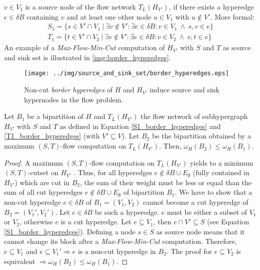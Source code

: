 $v \in V_1$ is a source node of the flow network $T_L(H_{V'})$, if there exists
a hyperedge $e \in \delta B$ containing $v$ and at least one other node $u \in V_1$ with
$u \notin V'$. More formal:
\begin{align}
S_1 = \{ s \in V' \cap V_1\ |\ \exists v \notin V': \exists e \in \delta B: v \in V_1\ \land\ s,v \in e \} \label{S1_border_hyperedges}\\
T_1 = \{ t \in V' \cap V_2\ |\ \exists v \notin V': \exists e \in \delta B: v \in V_2\ \land\ v,t \in e \} \label{T1_border_hyperedges}
\end{align}
An example of a \emph{Max-Flow-Min-Cut} computation of $H_{V'}$ with $S$ and $T$ as source and
sink set is illustrated in \autoref{img:border_hyperedges}.
\begin{figure}
\centering
\texttt{[image: ../img/source\_and\_sink\_set/border\_hyperedges.eps]}
\caption{Non-cut \emph{border hyperedges} of $H$ and $H_{V'}$ induce source and sink hypernodes
         in the flow problem.}
\label{img:border_hyperedges}
\end{figure}

\begin{lemma}
\label{cut_decrease_proof}
Let $B_1$ be a bipartition of $H$ and $T_L(H_{V'})$ the flow network of subhypergraph
$H_{V'}$ with $S$ and $T$ as defined in Equation \ref{S1_border_hyperedges} and \ref{T1_border_hyperedges} (with $V' \subseteq V$).
Let $B_2$ be the bipartition obtained by a maximum $(S,T)$-flow computation on $T_L(H_{V'})$.
Then, $\omega_H(B_2) \le \omega_H(B_1)$.
\end{lemma}

\begin{proof}
A maximum $(S,T)$-flow computation on $T_L(H_{V'})$ yields to a minimum $(S,T)$-cutset on 
$H_{V'}$ \cite{ford1956maximal}. Thus, for all hyperedges $e \notin \delta B \cup E_{\emptyset}$ (fully contained in $H_{V'}$)
which are cut in $B_2$, the sum of their weight must be less or equal than the sum of all cut hyperedges
$e \notin \delta B \cup E_{\emptyset}$ of bipartition $B_1$. We have to show that a non-cut
hyperedge $e \in \delta B$ of $B_1 = (V_1,V_2)$ cannot become a cut hyperedge of
$B_2 = (V_1',V_2')$. Let $e \in \delta B$ be such a hyperedge. $e$ must be either a subset of $V_1$ or $V_2$, otherwise
$e$ is a cut hyperedge. Let $e \subseteq V_1$, then $e \cap V' \subseteq S$ (see Equation \ref{S1_border_hyperedges}). 
Defining a node $s \in S$ as source node means that it cannot change its block after a \emph{Max-Flow-Min-Cut}
computation. Therefore, $e \subseteq V_1$ and $e \subseteq V_1' \Rightarrow e$ is a non-cut
hyperedge in $B_2$. The proof for $e \subseteq V_2$ is equivalent $\Rightarrow \omega_H(B_2) 
\le \omega_H(B_1)$.
\end{proof} 

